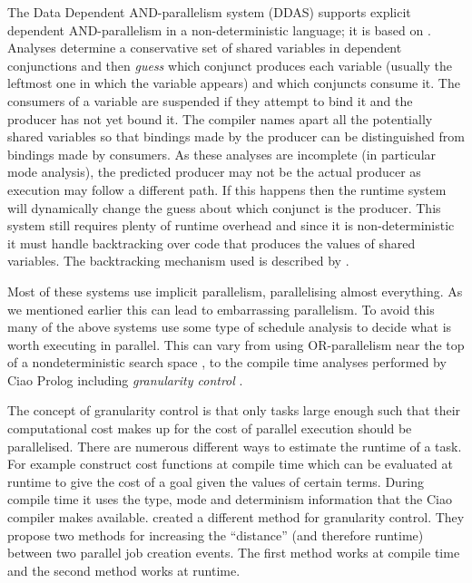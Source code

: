 The Data Dependent AND-parallelism system (DDAS)
\citet{pontelli:1996:ddas} supports explicit
dependent AND-parallelism in a non-deterministic language;
it is based on \citet{gupta:1991:ace}.
Analyses determine a conservative set of shared variables in dependent
conjunctions and then \emph{guess} which conjunct produces each variable
(usually the leftmost one in which the variable appears)
and which conjuncts consume it.
The consumers of a variable are suspended if they attempt to bind it and the
producer has not yet bound it.
The compiler names apart all the potentially shared variables so
that bindings made by the producer can be distinguished
from bindings made by consumers.
As these analyses are incomplete (in particular mode analysis),
the predicted producer may not be the actual producer as execution may
follow a different path.
If this happens then the runtime system will dynamically change the guess
about which conjunct is the producer.
This system still requires plenty of runtime overhead and since it is
non-deterministic it must handle backtracking over code that produces the
values of shared variables.
The backtracking mechanism used is described by \citet{shen:1996:daswam}.

Most of these systems use implicit parallelism, parallelising almost
everything.
As we mentioned earlier this can lead to embarrassing parallelism.
To avoid this many of the above systems use some type of schedule analysis
to decide what is worth executing in parallel.
This can vary from using OR-parallelism near the top of a nondeterministic
search space \citep{hausman:1987:or},
to the compile time analyses performed by Ciao Prolog
\citep{hermenegildo_ciao} including \emph{granularity control}
\citep{lopez96:distance_granularity}.

The concept of granularity control
\citep{debray:1990:granularity} is that only tasks
large enough such that their computational cost makes up for the cost of
parallel execution should be parallelised.
There are numerous different ways to estimate the runtime of a task.
For example \citet*{lopez96:distance_granularity} construct cost functions
at compile time which can be evaluated at runtime to give the cost of a
goal given the values of certain terms.
During compile time it uses the type, mode and determinism information that
the Ciao compiler makes available.
\citet*{shen_98_granularity-control} created a different method for
granularity control.
They propose two methods for increasing the ``distance''
(and therefore runtime)
between two parallel job creation events.
The first method works at compile time and the second method works at
runtime.

